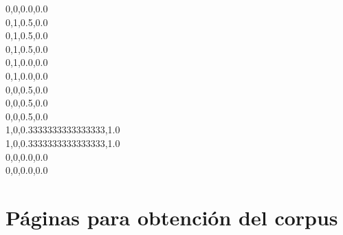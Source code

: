 0,0,0.0,0.0\\
0,1,0.5,0.0\\
0,1,0.5,0.0\\
0,1,0.5,0.0\\
0,1,0.0,0.0\\
0,1,0.0,0.0\\
0,0,0.5,0.0\\
0,0,0.5,0.0\\
0,0,0.5,0.0\\
1,0,0.3333333333333333,1.0\\
1,0,0.3333333333333333,1.0\\
0,0,0.0,0.0\\
0,0,0.0,0.0\\



\chapter{P\'aginas para obtenci\'on del corpus}
\label{corpus-apendice}

%


%



